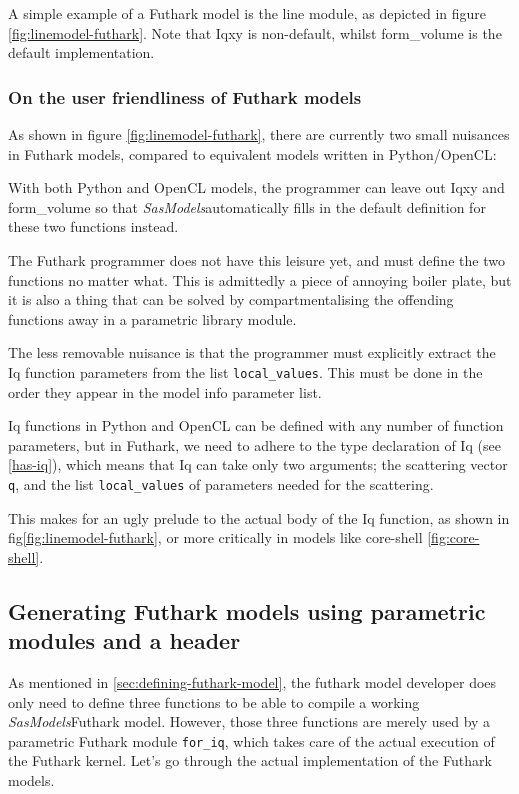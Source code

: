 \documentclass[11pt]{article}
\newcommand{\sasmodels}{\textit{SasModels}}
\begin{document}
A simple example of a Futhark model is the line module, 
as depicted in figure \ref{fig:linemodel-futhark}.
Note that Iqxy is non-default, whilst form\_volume is the default 
implementation.


\subsubsection{On the user friendliness of Futhark models}
As shown in figure \ref{fig:linemodel-futhark}, there are currently two small 
nuisances in Futhark models, compared to equivalent models written in
Python/OpenCL:

With both Python and OpenCL models, the programmer can leave out Iqxy and 
form\_volume so that \sasmodels automatically fills in the default definition
for these two functions instead.

The Futhark programmer does not have this leisure yet, and must define the two
functions no matter what. This is admittedly a piece of annoying boiler plate,
but it is also a thing that can be solved by compartmentalising the offending
functions away in a parametric library module.

The less removable nuisance is that the programmer must explicitly extract the
Iq function parameters from the list \texttt{local\_values}. This must be done
in the order they appear in the model info parameter list.

Iq functions in Python and OpenCL can be defined with any number of function 
parameters, but in Futhark, we need to adhere to the type declaration of Iq 
(see \ref{has-iq}), which means that Iq can take only two arguments; the 
scattering vector \texttt{q}, and the list \texttt{local\_values} of parameters
needed for the scattering.

This makes for an ugly prelude to the actual body of the Iq function, as shown
in fig\ref{fig:linemodel-futhark}, or more critically in models like 
core-shell \ref{fig:core-shell}.


\subsection{Generating Futhark models using parametric modules and a header}
\label{sec:generating-futhark}
As mentioned in \ref{sec:defining-futhark-model}, the futhark model developer
does only need to define three functions to be able to compile a working 
\sasmodels Futhark model.
However, those three functions are merely used by a parametric Futhark module 
\texttt{for\_iq}, which takes care of the actual execution of the 
Futhark kernel.
Let's go through the actual implementation of the Futhark models.
\end{document}
